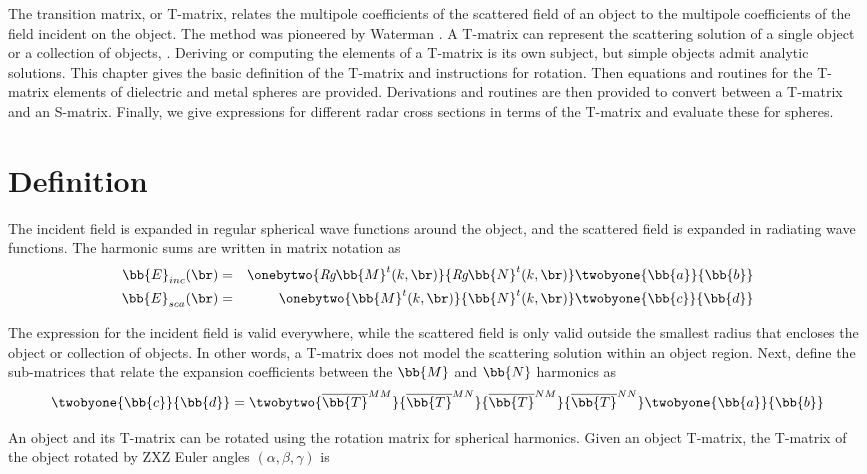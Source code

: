 


The transition matrix, or T-matrix, relates the multipole coefficients of the scattered field of an object to the multipole coefficients of the field incident on the object. The method was pioneered by Waterman \cite{waterman1965matrix}.  A T-matrix can represent the scattering solution of a single object or a collection of objects, \cite{chew1995waves}. Deriving or computing the elements of a T-matrix is its own subject, but simple objects admit analytic solutions. This chapter gives the basic definition of the T-matrix and instructions for rotation. Then equations and routines for the T-matrix elements of dielectric and metal spheres are provided. Derivations and routines are then provided to convert between a T-matrix and an S-matrix. Finally, we give expressions for different radar cross sections in terms of the T-matrix and evaluate these for spheres.


\section{Definition}

The incident field is expanded in regular spherical wave functions around the object, and the scattered field is expanded in radiating wave functions. The harmonic sums are written in matrix notation as
\begin{eqnarray}
\bb{E}_{inc}(\br) &=& \onebytwo{\textit{Rg}\bb{M}^t(k,\br)}{\textit{Rg}\bb{N}^t(k,\br)}\twobyone{\bb{a}}{\bb{b}} \\
\bb{E}_{sca}(\br) &=& \onebytwo{\bb{M}^t(k,\br)}{\bb{N}^t(k,\br)}\twobyone{\bb{c}}{\bb{d} \label{tmatrixesca} } 
\end{eqnarray}

The expression for the incident field is valid everywhere, while the scattered field is only valid outside the smallest radius that encloses the object or collection of objects. In other words, a T-matrix does not model the scattering solution within an object region.  Next, define the sub-matrices that relate the expansion coefficients between the $\bb{M}$ and $\bb{N}$ harmonics as  
\begin{equation}
\twobyone{\bb{c}}{\bb{d}} = \twobytwo{\overline{\bb{T}}^{MM}}{\overline{\bb{T}}^{MN} }{\overline{\bb{T}}^{NM}}{\overline{\bb{T}}^{NN}} \twobyone{\bb{a}}{\bb{b} \label{Tmatrixdef} }
\end{equation}


An object and its T-matrix can be rotated using the rotation matrix for spherical harmonics. Given an object T-matrix, the T-matrix of the object rotated by ZXZ Euler angles $(\alpha,\beta,\gamma)$ is

